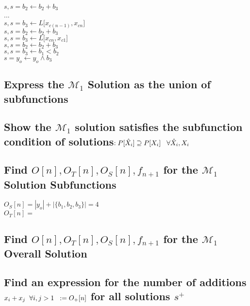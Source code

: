 \documentclass[11pt]{article}
\begin{document}
$s,s = b_2 \leftarrow b_2 + b_3$\\
...\\
$s,s = b_3 \leftarrow L \lbrack {x}_{c(n-1)}, {x}_{cn} \rbrack$\\
$s,s = b_2 \leftarrow b_2 + b_3$\\
$s,s = b_3 \leftarrow L \lbrack {x}_{cn}, {x}_{c1}\rbrack$\\
$s,s = b_2 \leftarrow b_2 + b_3$\\
$s,s = b_3 \leftarrow b_1 < b_2$\\
$s = y_o \leftarrow y_o \land b_3$







\subsection{Express the $\mathcal{M}_1$ Solution as the union of subfunctions}
\subsection{Show the  $\mathcal{M}_1$ solution satisfies the subfunction condition of solutions$: P[\hat{X}_i] \supseteq P[X_i] \hspace{3mm} \forall \hat{X}_i,X_i$}
\subsection{Find $O[n], O_T[n], O_S[n],f_{n+1}$ for the $\mathcal{M}_1$ Solution Subfunctions}
\begin{center}
$
O_S[n] = |y_o| + |\{b_1,b_2,b_3\}| = 4
$
\\ \vspace{2mm}
$
O_T[n] = 
$
\end{center}


\subsection{Find $O[n], O_T[n], O_S[n],f_{n+1}$ for the $\mathcal{M}_1$ Overall Solution}



\subsection{Find an expression for the number of additions $x_i + x_j \hspace{2mm} \forall i,j>1 \hspace{2mm} := O_{+}[n]$ for all solutions $s^+$}
\end{document}
